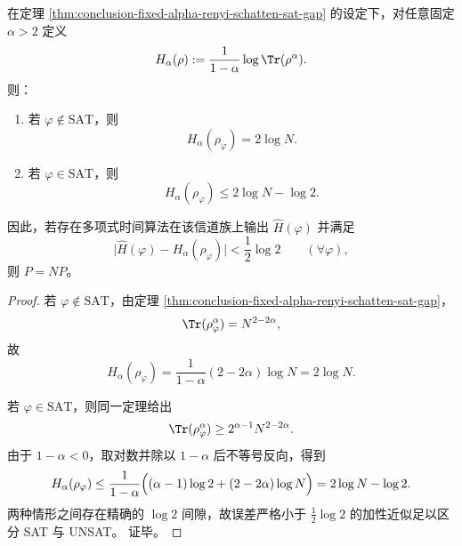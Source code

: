 \begin{corollary}\label{cor:conclusion-fixed-alpha-renyi-entropy-gap-sat-hard}
在定理 \ref{thm:conclusion-fixed-alpha-renyi-schatten-sat-gap} 的设定下，对任意固定 \(\alpha>2\) 定义
\[
H_\alpha(\rho):=\frac{1}{1-\alpha}\log \Tr(\rho^\alpha).
\]
则：
\begin{enumerate}
\normalfont
  \item 若 \(\varphi\notin\mathrm{SAT}\)，则
  \[
  H_\alpha(\rho_\varphi)=2\log N.
  \]
  \item 若 \(\varphi\in\mathrm{SAT}\)，则
  \[
  H_\alpha(\rho_\varphi)\le 2\log N-\log 2.
  \]
\end{enumerate}
因此，若存在多项式时间算法在该信道族上输出 \(\widehat H(\varphi)\) 并满足
\[
\bigl|\widehat H(\varphi)-H_\alpha(\rho_\varphi)\bigr|<\frac{1}{2}\log 2
\qquad(\forall \varphi),
\]
则 \(P=NP\)。
\end{corollary}
\begin{proof}
若 \(\varphi\notin\mathrm{SAT}\)，由定理 \ref{thm:conclusion-fixed-alpha-renyi-schatten-sat-gap}，
\[
\Tr(\rho_\varphi^\alpha)=N^{2-2\alpha},
\]
故
\[
H_\alpha(\rho_\varphi)
=
\frac{1}{1-\alpha}(2-2\alpha)\log N
=
2\log N.
\]

若 \(\varphi\in\mathrm{SAT}\)，则同一定理给出
\[
\Tr(\rho_\varphi^\alpha)\ge 2^{\alpha-1}N^{2-2\alpha}.
\]
由于 \(1-\alpha<0\)，取对数并除以 \(1-\alpha\) 后不等号反向，得到
\[
H_\alpha(\rho_\varphi)
\le
\frac{1}{1-\alpha}\Bigl((\alpha-1)\log 2+(2-2\alpha)\log N\Bigr)
=
2\log N-\log 2.
\]
两种情形之间存在精确的 \(\log 2\) 间隙，故误差严格小于 \(\frac12\log 2\) 的加性近似足以区分 SAT 与 UNSAT。
证毕。
\end{proof}

